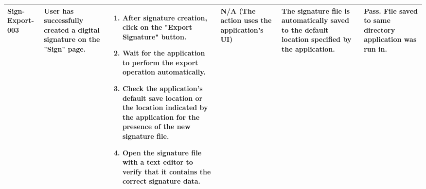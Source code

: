 \documentclass[]{final_report}
\theoremstyle{definition}
\begin{document}
\begin{longtable}{|l|p{2.5cm}|p{2.8cm}|p{2cm}|p{2cm}|p{2cm}|}
  \hline
  Sign-Export-003 & User has successfully created a digital signature on the "Sign" page. & 
  \begin{enumerate}
    \item After signature creation, click on the "Export Signature" button.
    \item Wait for the application to perform the export operation automatically.
    \item Check the application's default save location or the location indicated by the application for the presence of the new signature file.
    \item Open the signature file with a text editor to verify that it contains the correct signature data.
  \end{enumerate} & N/A (The action uses the application's UI) & The signature file is automatically saved to the default location specified by the application. & Pass. File saved to same directory application was run in.  \\
  \hline
\end{longtable}
\end{document}
